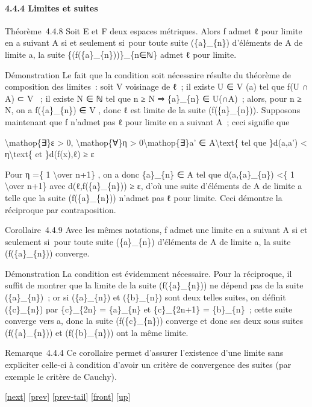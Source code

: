 \documentclass[]{article}
\begin{document}
\paragraph{4.4.4 Limites et suites}

Théorème~4.4.8 Soit E et F deux espaces métriques. Alors f admet ℓ pour
limite en a suivant A si et seulement si~pour toute suite (\{a\}\_\{n\})
d'éléments de A de limite a, la suite \{(f(\{a\}\_\{n\}))\}\_\{n∈ℕ\}
admet ℓ pour limite.

Démonstration Le fait que la condition soit nécessaire résulte du
théorème de composition des limites~: soit V voisinage de ℓ~; il existe
U ∈ V (a) tel que f(U ∩ A) ⊂ V ~; il existe N ∈ ℕ tel que n ≥ N ⇒
\{a\}\_\{n\} ∈ U(∩A)~; alors, pour n ≥ N, on a f(\{a\}\_\{n\}) ∈ V ,
donc ℓ est limite de la suite (f(\{a\}\_\{n\})). Supposons maintenant
que f n'admet pas ℓ pour limite en a suivant A~; ceci signifie que

\textbackslash{}mathop\{∃\}ε \textgreater{} 0,
\textbackslash{}mathop\{∀\}η \textgreater{}
0\textbackslash{}mathop\{∃\}a' ∈ A\textbackslash{}text\{ tel que
\}d(a,a') \textless{} η\textbackslash{}text\{ et \}d(f(x),ℓ) ≥ ε

Pour η =\{ 1 \textbackslash{}over n+1\} , on a donc \{a\}\_\{n\} ∈ A tel
que d(a,\{a\}\_\{n\}) \textless{}\{ 1 \textbackslash{}over n+1\} avec
d(ℓ,f(\{a\}\_\{n\})) ≥ ε, d'où une suite d'éléments de A de limite a
telle que la suite (f(\{a\}\_\{n\})) n'admet pas ℓ pour limite. Ceci
démontre la réciproque par contraposition.

Corollaire~4.4.9 Avec les mêmes notations, f admet une limite en a
suivant A si et seulement si~pour toute suite (\{a\}\_\{n\}) d'éléments
de A de limite a, la suite (f(\{a\}\_\{n\})) converge.

Démonstration La condition est évidemment nécessaire. Pour la
réciproque, il suffit de montrer que la limite de la suite
(f(\{a\}\_\{n\})) ne dépend pas de la suite (\{a\}\_\{n\})~; or si
(\{a\}\_\{n\}) et (\{b\}\_\{n\}) sont deux telles suites, on définit
(\{c\}\_\{n\}) par \{c\}\_\{2n\} = \{a\}\_\{n\} et \{c\}\_\{2n+1\} =
\{b\}\_\{n\}~; cette suite converge vers a, donc la suite
(f(\{c\}\_\{n\})) converge et donc ses deux sous suites
(f(\{a\}\_\{n\})) et (f(\{b\}\_\{n\})) ont la même limite.

Remarque~4.4.4 Ce corollaire permet d'assurer l'existence d'une limite
sans expliciter celle-ci à condition d'avoir un critère de convergence
des suites (par exemple le critère de Cauchy).

{[}\href{coursse22.html}{next}{]} {[}\href{coursse20.html}{prev}{]}
{[}\href{coursse20.html\#tailcoursse20.html}{prev-tail}{]}
{[}\href{coursse21.html}{front}{]}
{[}\href{coursch5.html\#coursse21.html}{up}{]}
\end{document}
